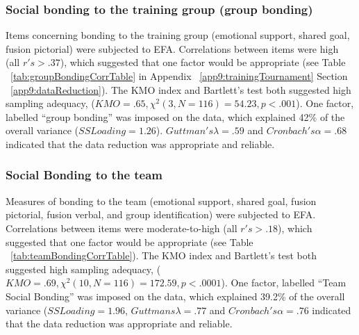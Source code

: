 
\subsubsection{Social bonding to the training group (group bonding)}
Items concerning bonding to the training group (emotional support, shared goal, fusion pictorial) were subjected to EFA.  Correlations between items were high (all $r's > .37$), which suggested that one factor would be appropriate (see Table ~\ref{tab:groupBondingCorrTable} in Appendix ~\ref{app9:trainingTournament} Section ~\ref{app9:dataReduction}). The KMO index and Bartlett's test both suggested high sampling adequacy, ($KMO =  .65, \chi^2(3, N = 116) = 54.23, p < .001$).
One factor, labelled ``group bonding'' was imposed on the data, which explained 42\% of the overall variance ($SS Loading = 1.26$). $Guttman's \lambda = .59$ and $Cronbach's \alpha = .68$ indicated that the data reduction was appropriate and reliable.

\subsubsection{Social Bonding to the team \label{app9:teamBondingEFA}}
Measures of bonding to the team (emotional support, shared goal, fusion pictorial, fusion verbal, and group identification) were subjected to EFA.  Correlations between items were moderate-to-high (all $r's > .18$), which suggested that one factor would be appropriate (see Table ~\ref{tab:teamBondingCorrTable}).
The KMO index and Bartlett's test both suggested high sampling adequacy, ($KMO = .69, \chi^2(10, N = 116) = 172.59, p < .0001$).
One factor, labelled ``Team Social Bonding'' was imposed on the data, which explained 39.2\% of the overall variance ($SS Loading = 1.96$, $Guttmans \lambda = .77$ and $Cronbach's \alpha = .76$ indicated that the data reduction was appropriate and reliable.

